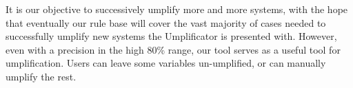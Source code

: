 It is our objective to successively umplify more and more systems, with the hope that eventually our rule base will cover the vast majority of cases needed to successfully umplify new systems the Umplificator is presented with. However, even with a precision in the high 80\% range, our tool serves as a useful tool for umplification. Users can leave some variables un-umplified, or can manually umplify the rest.

